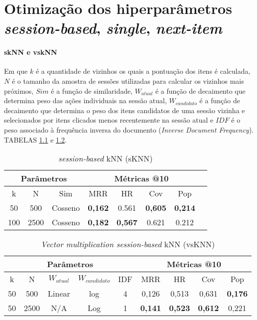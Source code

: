 \chapter{Otimização dos hiperparâmetros \textit{session-based}, \textit{single}, \textit{next-item}}

\subsubsection{skNN e vskNN}
Em que $k$ é a quantidade de vizinhos os quais a pontuação dos itens é
calculada, $N$ é o tamanho da amostra de sessões utilizadas para calcular os
vizinhos mais próximos, $Sim$ é a função de similaridade, $W_{atual}$ é a função
de decaimento que determina peso das ações individuais na sessão atual,
$W_{candidato}$ é a função de decaimento que determina o peso dos itens
candidatos de uma sessão vizinha e selecionados por itens clicados menos
recentemente na sessão atual e $IDF$ é o peso associado à frequência inversa do
documento (\textit{Inverse Document Frequency}). TABELAS \ref{app:sknn_a1} e
\ref{app:vsknn_a1}.
\begin{table}[htbp]
  \centering
  \begin{tabular}{|c|c|c|c|c|c|c|c|}
    \hline
    \multicolumn{3}{|c|}{Parâmetros} & \multicolumn{4}{c|}{Métricas @10} \\
    \hline
    k & N & Sim & MRR & HR & Cov & Pop\\
    \hline
    50 & 500 & Cosseno & \textbf{0,162} & 0.561 & \textbf{0,605} & \textbf{0,214} \\
    \hline
    100 & 2500 & Cosseno & \textbf{0,182} & \textbf{0,567} & 0.621 & 0.212 \\
    \hline
  \end{tabular}
  \label{app:sknn_a1}
  \caption{\textit{session-based} kNN (sKNN)}
\end{table}

\begin{table}[htbp]
  \centering
    \begin{tabular}{|c|c|c|c|c|c|c|c|c|}
      \hline
      \multicolumn{5}{|c|}{Parâmetros} & \multicolumn{4}{c|}{Métricas @10} \\
      \hline
      k & N & $W_{atual}$ & $W_{candidato}$ & IDF & MRR & HR & Cov & Pop \\
      \hline
      50 & 500 & Linear & log & 4 & 0,126 & 0,513  & 0,631 & \textbf{0,176} \\
      \hline
      50 & 2500 & N/A & Log & 1 & \textbf{0,141} & \textbf{0,523} & \textbf{0,612} & 0,221 \\
      \hline
    \end{tabular}
    \label{app:vsknn_a1}
    \caption{\textit{Vector multiplication session-based} kNN (vsKNN)}
  \end{table}

